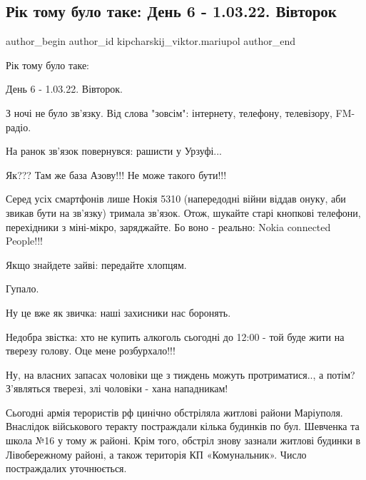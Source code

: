  
 
 
 
 

\subsection{Рік тому було таке:  День 6 - 1.03.22. Вівторок}
\label{sec:01_03_2023.fb.kipcharskij_viktor.mariupol.1.r_k_tomu_bulo_take__}

\ifcmt
 author_begin
   author_id kipcharskij_viktor.mariupol
 author_end
\fi

Рік тому було таке: 

День 6 - 1.03.22. Вівторок.

З ночі не було зв'язку. Від слова "зовсім": інтернету, телефону, телевізору,
FM-радіо.

На ранок зв'язок повернувся: рашисти у Урзуфі...

Як??? Там же база Азову!!! Не може такого бути!!!

Серед усіх смартфонів лише Нокія 5310 (напередодні війни віддав онуку, аби
звикав бути на зв'язку) тримала зв'язок. Отож, шукайте старі кнопкові телефони,
перехідники з міні-мікро, заряджайте. Бо воно - реально: Nokia connected
People!!!

Якщо знайдете зайві: передайте хлопцям.

Гупало.

Ну це вже як звичка: наші захисники нас боронять.

Недобра звістка: хто не купить алкоголь сьогодні до 12:00 - той буде жити на
тверезу голову. Оце мене розбурхало!!!

Ну, на власних запасах чоловіки  ще з тиждень можуть протриматися.., а потім?
З'являться тверезі, злі чоловіки - хана нападникам!

Сьогодні армія терористів рф цинічно обстріляла житлові райони Маріуполя.
Внаслідок військового теракту постраждали кілька будинків по бул. Шевченка та
школа №16 у тому ж районі. Крім того, обстріл знову зазнали житлові будинки в
Лівобережному районі, а також територія КП «Комунальник». Число постраждалих
уточнюється.

